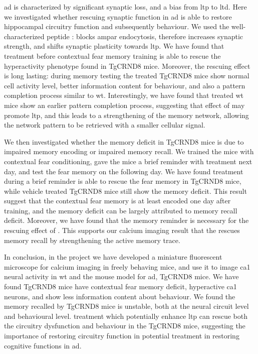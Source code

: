\Gls{ad} is characterized by significant synaptic loss, and a bias from \gls{ltp} to \gls{ltd}. Here we investigated whether rescuing synaptic function in \gls{ad} is able to restore hippocampal circuitry function and subsequently behaviour. We used the well-characterized peptide \tglu{}: \tglu{} blocks \gls{ampar} endocytosis, therefore increases synaptic strength, and shifts synaptic plasticity towards \gls{ltp}. We have found that \tglu{} treatment before contextual fear memory training is able to rescue the hyperactivity phenotype found in TgCRND8 mice. Moreover, the rescuing effect is long lasting: during memory testing the treated TgCRND8 mice show normal cell activity level, better information content for behaviour, and also a pattern completion process similar to \gls{wt}. Interestingly, we have found that \tglu{} treated \gls{wt} mice show an earlier pattern completion process, suggesting that effect of \tglu{} may promote \gls{ltp}, and this leads to a strengthening of the memory network, allowing the network pattern to be retrieved with a smaller cellular signal. 

We then investigated whether the memory deficit in TgCRND8 mice is due to impaired memory encoding or impaired memory recall. We trained the mice with contextual fear conditioning, gave the mice a brief reminder with \tglu{} treatment next day, and test the fear memory on the following day. We have found \tglu{} treatment during a brief reminder is able to rescue the fear memory in TgCRND8 mice, while vehicle treated TgCRND8 mice still show the memory deficit. This result suggest that the contextual fear memory is at least encoded one day after training, and the memory deficit can be largely attributed to memory recall deficit. Moreover, we have found that the memory reminder is necessary for the rescuing effect of \tglu{}. This supports our calcium imaging result that the \tglu{} rescues memory recall by strengthening the active memory trace. 

In conclusion, in the project we have developed a miniature fluorescent microscope for calcium imaging in freely behaving mice, and use it to image \gls{ca1} neural activity in \gls{wt} and the mouse model for \gls{ad}, TgCRND8 mice. We have found TgCRND8 mice have contextual fear memory deficit, hyperactive \gls{ca1} neurons, and show less information content about behaviour. We found the memory recalled by TgCRND8 mice is unstable, both at the neural circuit level and behavioural level. \tglu{} treatment which potentially enhance \gls{ltp} can rescue both the circuitry dysfunction and behaviour in the TgCRND8 mice, suggesting the importance of restoring circuitry function in potential treatment in restoring cognitive functions in \gls{ad}.

